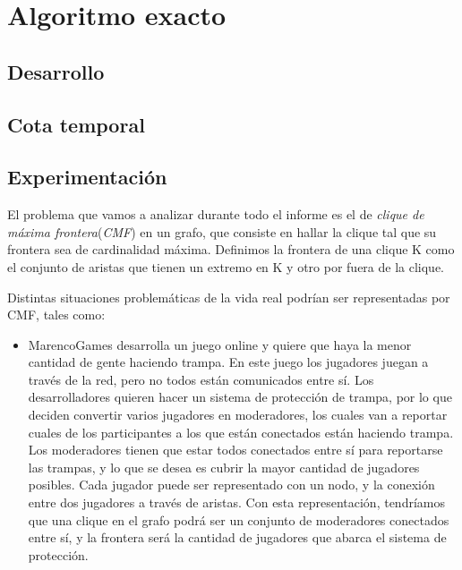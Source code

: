 \section{Algoritmo exacto}
\subsection{Desarrollo}


\subsection{Cota temporal}

\subsection{Experimentación}
El problema que vamos a analizar durante todo el informe es el de \textit{clique de máxima frontera}(\textit{CMF}) en un grafo, que consiste en hallar la clique tal que su frontera sea de cardinalidad máxima. Definimos la frontera de una clique K como el conjunto de aristas que tienen un extremo en K y otro por fuera de la clique.

Distintas situaciones problemáticas de la vida real podrían ser representadas por CMF, tales como:

\begin{itemize}

\item MarencoGames desarrolla un juego online y quiere que haya la menor cantidad de gente haciendo trampa. En este juego los jugadores juegan a través de la red, pero no todos están comunicados entre sí. Los desarrolladores quieren hacer un sistema de protección de trampa, por lo que deciden convertir varios jugadores en moderadores, los cuales van a reportar cuales de los participantes a los que están conectados están haciendo trampa. Los moderadores tienen que estar todos conectados entre sí para reportarse las trampas, y lo que se desea es cubrir la mayor cantidad de jugadores posibles.  Cada jugador puede ser representado con un nodo, y la conexión entre dos jugadores a través de aristas. Con esta representación, tendríamos que una clique en el grafo podrá ser un conjunto de moderadores conectados entre sí, y la frontera será la cantidad de jugadores que abarca el sistema de protección.


\end{itemize}


